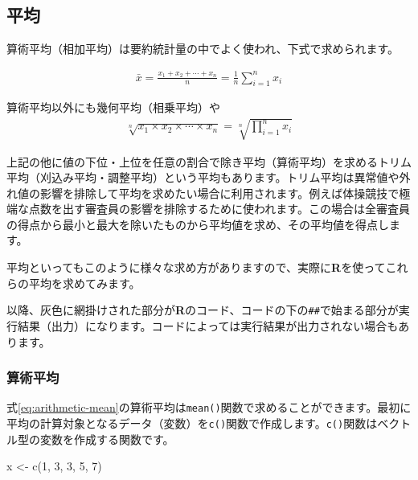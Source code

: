 \documentclass[
  12pt,
]{book}
\newenvironment{Shaded}{\begin{snugshade}}{\end{snugshade}}
\newcommand{\DecValTok}[1]{\textcolor[rgb]{0.00,0.00,0.81}{#1}}
\newcommand{\FunctionTok}[1]{\textcolor[rgb]{0.00,0.00,0.00}{#1}}
\newcommand{\NormalTok}[1]{#1}
\newcommand{\OtherTok}[1]{\textcolor[rgb]{0.56,0.35,0.01}{#1}}
\begin{document}
\hypertarget{ux5e73ux5747}{%
\subsection{平均}\label{ux5e73ux5747}}

算術平均（相加平均）は要約統計量の中でよく使われ、下式で求められます。

\begin{align}
  \bar{x} = \frac{x_1 + x_2 + \cdots + x_n}{n} = \frac{1}{n} \sum_{i = 1}^n x_i \label{eq:arithmetic-mean}
\end{align}

算術平均以外にも幾何平均（相乗平均）や \begin{align}
  \sqrt[n]{x_1 \times x_2 \times \cdots \times x_n} = \sqrt[n]{\prod_{i = 1}^n x_i} \label{eq:geometric-mean}
\end{align}

上記の他に値の下位・上位を任意の割合で除き平均（算術平均）を求めるトリム平均（刈込み平均・調整平均）という平均もあります。トリム平均は異常値や外れ値の影響を排除して平均を求めたい場合に利用されます。例えば体操競技で極端な点数を出す審査員の影響を排除するために使われます。この場合は全審査員の得点から最小と最大を除いたものから平均値を求め、その平均値を得点します。

平均といってもこのように様々な求め方がありますので、実際に\textbf{R}を使ってこれらの平均を求めてみます。

以降、灰色に網掛けされた部分が\textbf{R}のコード、コードの下の\texttt{\#\#}で始まる部分が実行結果（出力）になります。コードによっては実行結果が出力されない場合もあります。

\hypertarget{ux7b97ux8853ux5e73ux5747}{%
\subsubsection{算術平均}\label{ux7b97ux8853ux5e73ux5747}}

式\eqref{eq:arithmetic-mean}の算術平均は\texttt{mean()}関数で求めることができます。最初に平均の計算対象となるデータ（変数）を\texttt{c()}関数で作成します。\texttt{c()}関数はベクトル型の変数を作成する関数です。

\begin{Shaded}
\begin{Highlighting}[numbers=left,,]
\NormalTok{x }\OtherTok{\textless{}{-}} \FunctionTok{c}\NormalTok{(}\DecValTok{1}\NormalTok{, }\DecValTok{3}\NormalTok{, }\DecValTok{3}\NormalTok{, }\DecValTok{5}\NormalTok{, }\DecValTok{7}\NormalTok{)}
\end{Highlighting}
\end{Shaded}
\end{document}
